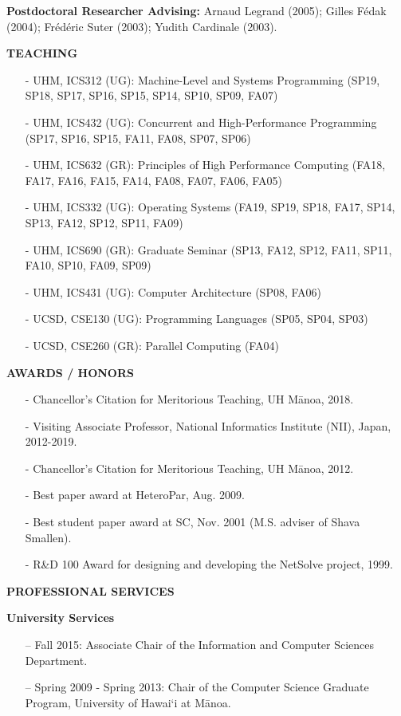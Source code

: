 \documentclass[times,11pt]{letter}
\begin{document}
\noindent
{\bf Postdoctoral Researcher Advising:}
 Arnaud Legrand (2005);
 Gilles F\'edak (2004);
 Fr\'ed\'eric Suter (2003);
 Yudith Cardinale (2003).


\noindent
{\large{\bf TEACHING}}


\begin{itemize}
\item [-] UHM, ICS312 (UG): Machine-Level and Systems Programming (SP19, SP18, SP17, SP16, SP15, SP14, SP10, SP09, FA07)
\item [-] UHM, ICS432 (UG): Concurrent and High-Performance Programming (SP17, SP16, SP15, FA11, FA08, SP07, SP06)
\item [-] UHM, ICS632 (GR): Principles of High Performance Computing (FA18, FA17, FA16, FA15, FA14, FA08, FA07, FA06, FA05)
\item [-] UHM, ICS332 (UG): Operating Systems (FA19, SP19, SP18, FA17, SP14, SP13, FA12, SP12, SP11, FA09)
\item [-] UHM, ICS690 (GR): Graduate Seminar (SP13, FA12, SP12, FA11, SP11, FA10, SP10, FA09, SP09)
\item [-] UHM, ICS431 (UG): Computer Architecture (SP08, FA06)
\item [-] UCSD, CSE130 (UG): Programming Languages (SP05, SP04, SP03)
\item [-] UCSD, CSE260 (GR): Parallel Computing (FA04)
\end{itemize}

\noindent
{\large{\bf AWARDS / HONORS}}
\begin{itemize}
\item[-] Chancellor's Citation for Meritorious Teaching, UH M\=anoa, 2018.
\item[-] Visiting Associate Professor, National Informatics Institute (NII), Japan, 2012-2019.
\item[-] Chancellor's Citation for Meritorious Teaching, UH M\=anoa, 2012.
\item[-] Best paper award at HeteroPar, Aug. 2009.
\item[-] Best student paper award at SC, Nov. 2001 (M.S. adviser of Shava Smallen).
\item[-] R\&D 100 Award for designing and developing the NetSolve project, 1999.
\end{itemize}

\noindent
{\large\bf{PROFESSIONAL SERVICES}}

\noindent
{\bf University Services}
\begin{itemize}
\item [--] Fall 2015: Associate Chair of the Information and Computer Sciences Department. 
\item [--] Spring 2009 - Spring 2013: Chair of the Computer Science Graduate Program, University of Hawai`i at M\=anoa.
\end{itemize}
\end{document}
